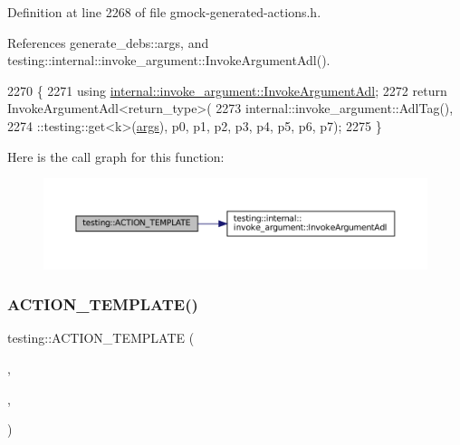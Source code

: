 Definition at line 2268 of file gmock-\/generated-\/actions.\+h.



References generate\+\_\+debs\+::args, and testing\+::internal\+::invoke\+\_\+argument\+::\+Invoke\+Argument\+Adl().


\begin{DoxyCode}
2270                                                                     \{
2271   \textcolor{keyword}{using} \hyperlink{namespacetesting_1_1internal_1_1invoke__argument_abd36164191a3e386c50243074854b272}{internal::invoke\_argument::InvokeArgumentAdl};
2272   \textcolor{keywordflow}{return} InvokeArgumentAdl<return\_type>(
2273       internal::invoke\_argument::AdlTag(),
2274       ::testing::get<k>(\hyperlink{namespacegenerate__debs_a75f9143e38df82d83b2e8a6f99cae02c}{args}), p0, p1, p2, p3, p4, p5, p6, p7);
2275 \}
\end{DoxyCode}
Here is the call graph for this function\+:
\nopagebreak
\begin{figure}[H]
\begin{center}
\leavevmode
\includegraphics[width=350pt]{namespacetesting_a8725892aafb62cc8f6f76280d29595d8_cgraph}
\end{center}
\end{figure}
\mbox{\label{namespacetesting_a910551adbfeb1854071ef55ae54a5c0f}} 
\subsubsection{\texorpdfstring{A\+C\+T\+I\+O\+N\+\_\+\+T\+E\+M\+P\+L\+A\+T\+E()}{ACTION\_TEMPLATE()}\hspace{0.1cm}{\footnotesize\ttfamily [16/28]}}
{\footnotesize\ttfamily testing\+::\+A\+C\+T\+I\+O\+N\+\_\+\+T\+E\+M\+P\+L\+A\+TE (\begin{DoxyParamCaption}\item[{Invoke\+Argument}]{,  }\item[{H\+A\+S\+\_\+1\+\_\+\+T\+E\+M\+P\+L\+A\+T\+E\+\_\+\+P\+A\+R\+A\+MS(int, k)}]{,  }\item[{A\+N\+D\+\_\+9\+\_\+\+V\+A\+L\+U\+E\+\_\+\+P\+A\+R\+A\+MS(p0, p1, p2, p3, p4, p5, p6, p7, p8)}]{ }\end{DoxyParamCaption})}



